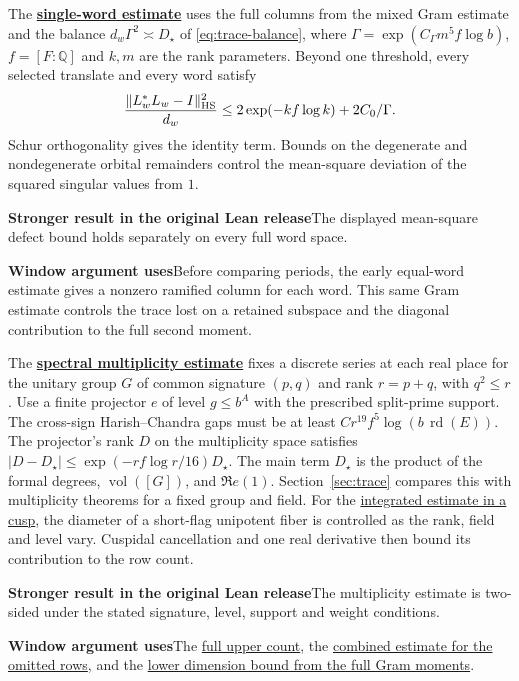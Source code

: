 \documentclass[11pt,a4paper]{article}
\newcommand{\rhscopelabel}[2]{%
  {\setlength{\fboxsep}{2pt}\colorbox{#1}{%
    \small\sffamily\bfseries\color{PageInk}#2}}}
\newcommand{\rhrange}[3][Stronger result in the original Lean release]{%
  \par\addvspace{.45\baselineskip}\Needspace{4\baselineskip}%
  \begingroup\setlength{\leftskip}{.65em}\setlength{\parindent}{0pt}%
  \noindent\rhscopelabel{TraceTint}{#1}\enspace#2\par
  \nobreak\smallskip
  \noindent\rhscopelabel{FieldTint}{Window argument uses}\enspace#3\par
  \endgroup\addvspace{.45\baselineskip}}
\begin{document}
The \textbf{\hyperlink{candidate.diagonal}{single-word estimate}} uses the full
columns from the mixed Gram estimate and the balance \(d_w\Gamma^2\asymp D_\star\) of
\eqref{eq:trace-balance}, where \(\Gamma=\exp(C_\Gamma m^5 f\log b)\),
\(f=[F:\mathbb Q]\) and \(k,m\) are the rank parameters. Beyond one
threshold, every selected translate and every word satisfy
\[
 \frac{\|L_w^*L_w-I\|_{\rm HS}^2}{d_w}
 \le 2\exp(-kf\log k)+2C_0/\Gamma.
\]
Schur orthogonality gives the identity term. Bounds on the degenerate and
nondegenerate orbital remainders control the mean-square deviation of the
squared singular values from \(1\).
\rhrange{The displayed mean-square defect bound holds separately on
every full word space.}
{Before comparing periods, the early equal-word estimate gives a
nonzero ramified column for each word. This same Gram estimate
controls the trace lost on a retained subspace and the diagonal
contribution to the full second moment.}

The \textbf{\hyperlink{candidate.count}{spectral multiplicity estimate}} fixes a discrete
series at each real place for the unitary group \(G\) of common signature
\((p,q)\) and rank \(r=p+q\), with \(q^2\le r\). Use a finite projector
\(e\) of level \(g\le b^{A}\) with the prescribed split-prime support.
The cross-sign Harish--Chandra gaps must be at least
\(Cr^{19}f^5\log(b\,\operatorname{rd}(E))\).
The projector's rank \(D\) on the multiplicity space satisfies
\(|D-D_\star|\le \exp(-rf\log r/16)D_\star\). The main term \(D_\star\)
is the product of the formal degrees, \(\operatorname{vol}([G])\), and
\(\Re e(1)\). Section~\ref{sec:trace} compares this with multiplicity
theorems for a fixed group and field. For the
\hyperlink{proof.row-cusp-poincare}{integrated estimate in a cusp},
the diameter of a short-flag unipotent fiber is controlled as the
rank, field and level vary. Cuspidal cancellation and one real
derivative then bound its contribution to the row count.
\rhrange{The multiplicity estimate is two-sided under the stated
signature, level, support and weight conditions.}
{The \hyperlink{proof.one-sided-row-count}{full upper count},
the \hyperlink{proof.common-deep-row-cut}{combined estimate for the
omitted rows}, and the
\hyperlink{proof.full-moment-dimension}{lower dimension bound from
the full Gram moments}.}
\end{document}
